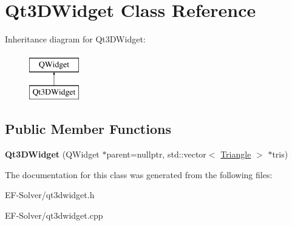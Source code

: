 \hypertarget{class_qt3_d_widget}{}\section{Qt3\+D\+Widget Class Reference}
\label{class_qt3_d_widget}
Inheritance diagram for Qt3\+D\+Widget\+:\begin{figure}[H]
\begin{center}
\leavevmode
\includegraphics[height=2.000000cm]{class_qt3_d_widget}
\end{center}
\end{figure}
\subsection*{Public Member Functions}
\begin{DoxyCompactItemize}
\item 
{\bfseries Qt3\+D\+Widget} (Q\+Widget $\ast$parent=nullptr, std\+::vector$<$ \hyperlink{struct_triangle}{Triangle} $>$ $\ast$tris)\hypertarget{class_qt3_d_widget_a1effac984ac97784861c8f2eac331a8a}{}\label{class_qt3_d_widget_a1effac984ac97784861c8f2eac331a8a}

\end{DoxyCompactItemize}


The documentation for this class was generated from the following files\+:\begin{DoxyCompactItemize}
\item 
E\+F-\/\+Solver/qt3dwidget.\+h\item 
E\+F-\/\+Solver/qt3dwidget.\+cpp\end{DoxyCompactItemize}
